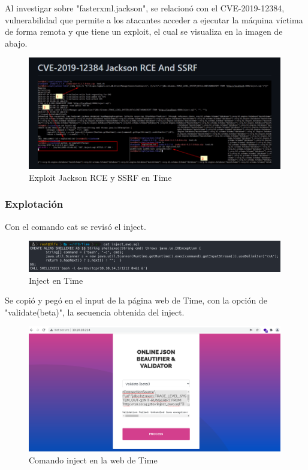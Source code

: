         \large{Al investigar sobre "fasterxml.jackson", se relacionó con el CVE-2019-12384, vulnerabilidad que permite a los atacantes acceder a ejecutar la máquina víctima de forma remota y que tiene un exploit, el cual se visualiza en la imagen de abajo.}
        \par
        \begin{figure}[H]
            \centering
            \includegraphics[width=0.99\textwidth]{imagenes/time/03_exploit_jackson.png}
            \caption{Exploit Jackson RCE y SSRF en Time}
        \end{figure}

    \subsubsection{Explotación}

        \large{Con el comando cat se revisó el inject.}
        \par
        \begin{figure}[H]
            \centering
            \includegraphics[width=0.99\textwidth]{imagenes/time/04_inject_time.png}
            \caption{Inject en Time}
        \end{figure}

        \large{Se copió y pegó en el input de la página web de Time, con la opción de "validate(beta)", la secuencia obtenida del inject.}
        \par
        \begin{figure}[H]
            \centering
            \includegraphics[width=0.99\textwidth]{imagenes/time/05_web_command_time.png}
            \caption{Comando inject en la web de Time}
        \end{figure}

